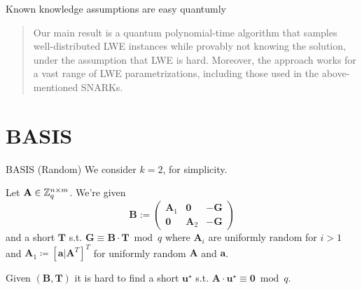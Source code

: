 \documentclass[xcolor=table,10pt,aspectratio=169]{beamer}
\renewcommand{\vec}[1]{\ensuremath{\mathbf{#1}}\xspace}
\providecommand{\mat}[1]{\ensuremath{\vec{#1}}\xspace}
\begin{document}
\begin{frame}[label={sec:org33a8f30}]{Known knowledge assumptions are easy quantumly}
\begin{quote}
Our main result is a quantum polynomial-time algorithm that samples well-distributed LWE instances while provably not knowing the solution, under the assumption that LWE is hard. Moreover, the approach works for a vast range of LWE parametrizations, including those used in the above-mentioned SNARKs.
\end{quote}

\end{frame}

\section{BASIS}
\label{sec:orgc9a0f65}
\begin{frame}[label={sec:org977af88}]{BASIS (Random)}
We consider \(k=2\), for simplicity.

\begin{definition}
Let \(\mat{A} \in \ZZ_{q}^{n \times m}\). We're given
\[
\vec{B} := \begin{pmatrix}\mat{A}_{1} & \vec{0} & - \vec{G}\\\vec{0} & \mat{A}_{2} & -\vec{G}\end{pmatrix}
\] and a short \(\vec{T}\) s.t. \(\vec{G} \equiv \vec{B} \cdot \vec{T} \bmod q\)
where \(\mat{A}_{i}\) are uniformly random for \(i>1\) and \(\mat{A}_{1} \coloneqq  [\vec{a} | \mat{A}^{T}]^{T}\) for uniformly random \(\mat{A}\) and \(\vec{a}\).

Given \((\vec{B}, \vec{T})\) it is hard to find a short \(\vec{u}^{\star}\) s.t. \(\mat{A} \cdot \vec{u}^{\star} \equiv \vec{0} \bmod q\).
\end{definition}

{\footnotesize {} \par}
\end{frame}
\end{document}
